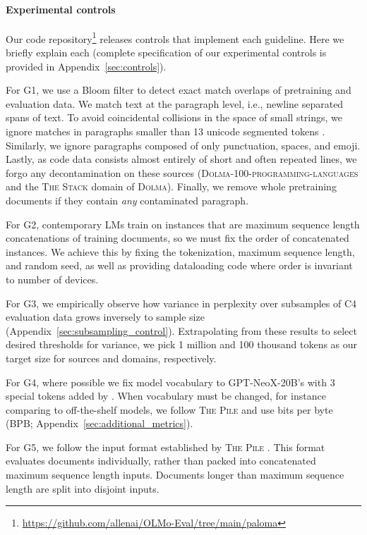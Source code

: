 \label{sec:experimental_controls}
\paragraph{Experimental controls} Our code repository\footnote{\url{https://github.com/allenai/OLMo-Eval/tree/main/paloma}} releases controls that implement each guideline. Here we briefly explain each (complete specification of our experimental controls is provided in Appendix~\ref{sec:controls}).

For \textsc{G1}, we use a Bloom filter \citep{Bloom1970SpacetimeTI} to detect exact match overlaps of pretraining and evaluation data. We match text at the paragraph level, i.e., newline separated spans of text. To avoid coincidental collisions in the space of small strings, we ignore matches in paragraphs smaller than 13 unicode segmented tokens \citep{uniseg}. Similarly, we ignore paragraphs composed of only punctuation, spaces, and emoji. Lastly, as code data consists almost entirely of short and often repeated lines, we forgo any decontamination on these sources (\textsc{Dolma-100-programming-languages} and the \textsc{The Stack} domain of \textsc{Dolma}). Finally, we remove whole pretraining documents if they contain \textit{any} contaminated paragraph.

For \textsc{G2}, contemporary LMs train on instances that are maximum sequence length concatenations of training documents, so we must fix the order of concatenated instances. We achieve this by fixing the tokenization, maximum sequence length, and random seed, as well as providing dataloading code where order is invariant to number of devices.

For \textsc{G3}, we empirically observe how variance in perplexity over subsamples of \textsc{C4} evaluation data grows inversely to sample size (Appendix~\ref{sec:subsampling_control}). Extrapolating from these results to select desired thresholds for variance, we pick 1 million and 100 thousand tokens as our target size for sources and domains, respectively.

For \textsc{G4}, where possible we fix model vocabulary to GPT-NeoX-20B's \citep{gpt-neo} with 3 special tokens added by \citet{Groeneveld2024OLMoAT}. When vocabulary must be changed, for instance comparing to off-the-shelf models, we follow \textsc{The Pile} \citep{Gao2020ThePA} and use bits per byte (BPB; Appendix~\ref{sec:additional_metrics}).

For \textsc{G5}, we follow the input format established by \textsc{The Pile} \citep{Gao2020ThePA}. This format evaluates documents individually, rather than packed into concatenated maximum sequence length inputs. Documents longer than maximum sequence length are split into disjoint inputs. 

